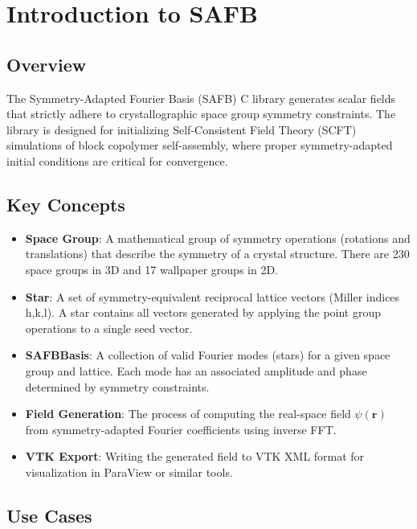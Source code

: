 \chapter{Introduction to SAFB}

\section{Overview}

The Symmetry-Adapted Fourier Basis (SAFB) C library generates scalar fields that strictly adhere to crystallographic space group symmetry constraints. The library is designed for initializing Self-Consistent Field Theory (SCFT) simulations of block copolymer self-assembly, where proper symmetry-adapted initial conditions are critical for convergence.

\section{Key Concepts}

\begin{itemize}
    \item \textbf{Space Group}: A mathematical group of symmetry operations (rotations and translations) that describe the symmetry of a crystal structure. There are 230 space groups in 3D and 17 wallpaper groups in 2D.

    \item \textbf{Star}: A set of symmetry-equivalent reciprocal lattice vectors (Miller indices h,k,l). A star contains all vectors generated by applying the point group operations to a single seed vector.

    \item \textbf{SAFBBasis}: A collection of valid Fourier modes (stars) for a given space group and lattice. Each mode has an associated amplitude and phase determined by symmetry constraints.

    \item \textbf{Field Generation}: The process of computing the real-space field $\psi(\boldsymbol{r})$ from symmetry-adapted Fourier coefficients using inverse FFT.

    \item \textbf{VTK Export}: Writing the generated field to VTK XML format for visualization in ParaView or similar tools.
\end{itemize}

\section{Use Cases}

